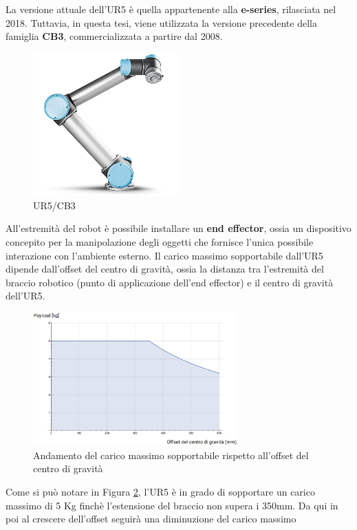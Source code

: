 La versione attuale dell'UR5 \`{e} quella appartenente alla \textbf{e-series}, rilasciata nel 2018. 
Tuttavia, in questa tesi, viene utilizzata la versione precedente della famiglia \textbf{CB3}, commercializzata a partire dal 
2008.
\begin{figure}[H]
    \centering
    \includegraphics*[width=0.5\textwidth]{images/ur5.png}
    \caption{UR5/CB3}
    \label{fig:ur5}
\end{figure}
All'estremit\`{a} del robot \`{e} possibile installare un \textbf{end effector}, ossia un dispositivo concepito 
per la manipolazione degli oggetti che fornisce l'unica possibile interazione con l'ambiente esterno.
Il carico massimo sopportabile dall'UR5 dipende dall'offset del centro di gravit\`{a}, ossia la distanza tra l'estremit\`{a}  
del braccio robotico (punto di applicazione dell'end effector) e il centro di gravit\`{a} dell'UR5. 
\begin{figure}[H]
    \centering
    \includegraphics*[width=0.7\textwidth]{images/payload.png}
    \caption{Andamento del carico massimo sopportabile rispetto all'offset del centro di gravit\`{a}}
    \label{fig:payload}
\end{figure}
Come si pu\`{o} notare in Figura \ref{fig:payload}, l'UR5 \`{e} in grado di sopportare un carico massimo di 5 Kg finch\`{e} 
l'estensione del braccio non supera i 350mm. Da qui in poi al crescere dell'offset seguir\`{a} una diminuzione del carico massimo 
